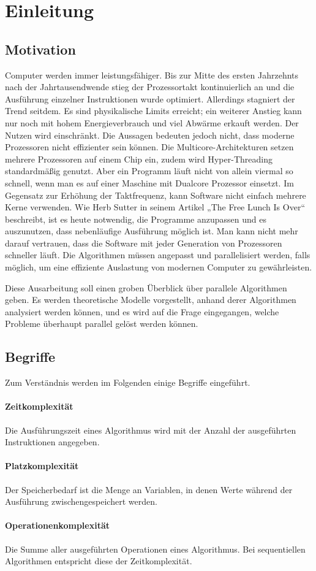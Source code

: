 \section{Einleitung}

\subsection{Motivation}
Computer werden immer leistungsfähiger.
Bis zur Mitte des ersten Jahrzehnts nach der Jahrtausendwende stieg der
Prozessortakt kontinuierlich an und die Ausführung einzelner Instruktionen
wurde optimiert.
Allerdings stagniert der Trend seitdem.
Es sind physikalische Limits erreicht; ein weiterer Anstieg kann nur noch
mit hohem Energieverbrauch und viel Abwärme erkauft werden.
Der Nutzen wird einschränkt.
Die Aussagen bedeuten jedoch nicht, dass moderne Prozessoren nicht effizienter
sein können.
Die Multicore-Architekturen setzen mehrere Prozessoren auf einem Chip ein,
zudem wird Hyper-Threading standardmäßig genutzt.
Aber ein Programm läuft nicht von allein viermal so schnell, wenn man es auf
einer Maschine mit Dualcore Prozessor einsetzt.
Im Gegensatz zur Erhöhung der Taktfrequenz, kann Software nicht einfach mehrere
Kerne verwenden.
Wie Herb Sutter in seinem Artikel „The Free Lunch Is Over“
\cite{sutterlunch} beschreibt, ist es heute notwendig, die Programme anzupassen
und es auszunutzen, dass nebenläufige Ausführung möglich ist.
Man kann nicht mehr darauf vertrauen, dass die Software mit jeder Generation
von Prozessoren schneller läuft.
Die Algorithmen müssen angepasst und parallelisiert werden, falls möglich, um
eine effiziente Auslastung von modernen Computer zu gewährleisten.

Diese Ausarbeitung soll einen groben Überblick über parallele Algorithmen geben.
Es werden theoretische Modelle vorgestellt, anhand derer Algorithmen analysiert
werden können, und es wird auf die Frage eingegangen, welche Probleme überhaupt
parallel gelöst werden können.

\subsection{Begriffe}
Zum Verständnis werden im Folgenden einige Begriffe eingeführt.

\paragraph{Zeitkomplexität}
Die Ausführungszeit eines Algorithmus wird mit der Anzahl der ausgeführten Instruktionen angegeben.

\paragraph{Platzkomplexität}
Der Speicherbedarf ist die Menge an Variablen, in denen Werte während der Ausführung zwischengespeichert werden.

\paragraph{Operationenkomplexität}
Die Summe aller ausgeführten Operationen eines Algorithmus. Bei sequentiellen Algorithmen entspricht diese der Zeitkomplexität.
